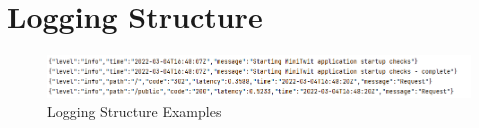 \section{Logging Structure}\label{app:logging_structure}

\begin{figure}[H]
    \centering
    \includegraphics[width = \linewidth]{images/logging/logging_structure_1.png}
    \caption{Logging Structure Examples}
\end{figure}